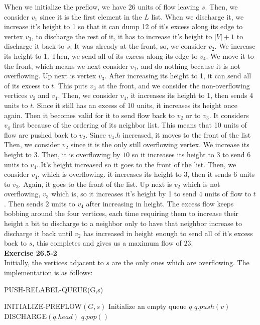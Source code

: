 \documentclass{article}
\begin{document}
When we initialize the preflow, we have 26 units of flow leaving $s$. Then, we consider $v_1$ since it is the first element in the $L$ list. When we discharge it, we increase it's height to 1 so that it can dump 12 of it's excess along its edge to vertex $v_3$, to discharge the rest of it, it has to increase it's height to $|V| +1$ to discharge it back to $s$. It was already at the front, so, we consider $v_2$. We increase its height to 1.  Then, we send all of its excess along its edge to $v_4$. We move it to the front, which means we next consider $v_1$, and do nothing because it is not overflowing. Up next is vertex $v_3$. After increasing its height to 1, it can send all of its excess to $t$. This puts $v_3$ at the front, and we consider the non-overflowing vertices $v_2$ and $v_1$. Then, we consider $v_4$, it increases its height to 1, then sends 4 units to $t$. Since it still has an excess of 10 units, it increases its height once again. Then it becomes valid for it to send flow back to $v_2$ or to $v_3$. It considers $v_4$ first because of the ordering of its neighbor list. This means that 10 units of flow are pushed back to $v_2$. Since $v_4.h$ increased, it moves to the front of the list Then, we consider $v_2$ since it is the only still overflowing vertex. We increase its height to 3. Then, it is overflowing by $10$ so it increases its height to $3$ to send $6$ units to $v_4$. It's height increased so it goes to the front of the list. Then, we consider $v_4$, which is overflowing. it increases its height to $3$, then it sends $6$ units to $v_3$. Again, it goes to the front of the list. Up next is $v_2$ which is not overflowing, $v_3$ which is, so it increases it's height by 1 to send $4$ units of flow to $t$. Then sends $2$ units to $v_4$ after increasing in height. The excess flow keeps bobbing around the four vertices, each time requiring them to increase their height a bit to discharge to a neighbor only to have that neighbor increase to discharge it back until $v_2$ has increased in height enough to send all of it's excess back to $s$, this completes and gives us a maximum flow of $23$.\\

\noindent\textbf{Exercise 26.5-2}\\

Initially, the vertices adjacent to $s$ are the only ones which are overflowing.  The implementation is as follows:

\begin{algorithm}
\caption{PUSH-RELABEL-QUEUE(G,s)}
\begin{algorithmic}[1]
\State INITIALIZE-PREFLOW$(G,s)$
\State Initialize an empty queue $q$
	\State $q.push(v)$
\EndFor
{}
	\State DISCHARGE$(q.head)$
	\State $q.pop()$
\EndWhile
\end{algorithmic}
\end{algorithm}
\end{document}
